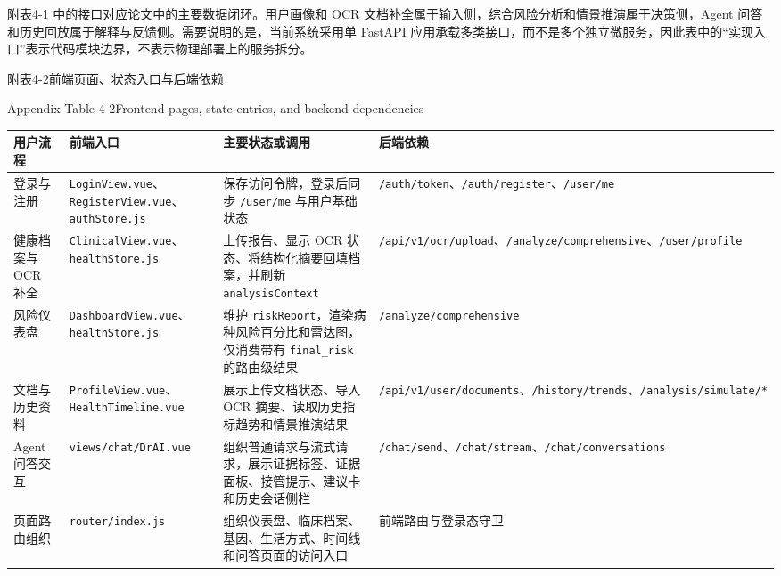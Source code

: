 \documentclass[UTF8, a4paper, 12pt, oneside]{ctexrep}
\numberwithin{equation}{chapter}
\newcommand{\codeid}[1]{{\begingroup\urlstyle{rm}\nolinkurl{#1}\endgroup}}
\begin{document}
{\vspace{\baselineskip}
附表4-1 中的接口对应论文中的主要数据闭环。用户画像和 OCR 文档补全属于输入侧，综合风险分析和情景推演属于决策侧，Agent 问答和历史回放属于解释与反馈侧。需要说明的是，当前系统采用单 FastAPI 应用承载多类接口，而不是多个独立微服务，因此表中的“实现入口”表示代码模块边界，不表示物理部署上的服务拆分。

\vspace{0.5\baselineskip}
\begin{center}
{\songti{}附表4-2\quad 前端页面、状态入口与后端依赖\par}
{\rmfamily{}Appendix Table 4-2\quad Frontend pages, state entries, and backend dependencies\par}
\end{center}
\vspace{-0.5\baselineskip}
{\songti{}
\noindent\begin{tabular}{@{}>{\raggedright\arraybackslash}p{} >{\raggedright\arraybackslash}p{} >{\raggedright\arraybackslash}p{} >{\raggedright\arraybackslash}p{}@{}}
\toprule
用户流程 & 前端入口 & 主要状态或调用 & 后端依赖 \\
\midrule
登录与注册 & \codeid{LoginView.vue}、\codeid{RegisterView.vue}、\codeid{authStore.js} & 保存访问令牌，登录后同步 \codeid{/user/me} 与用户基础状态 & \codeid{/auth/token}、\codeid{/auth/register}、\codeid{/user/me} \\
健康档案与 OCR 补全 & \codeid{ClinicalView.vue}、\codeid{healthStore.js} & 上传报告、显示 OCR 状态、将结构化摘要回填档案，并刷新 \codeid{analysisContext} & \codeid{/api/v1/ocr/upload}、\codeid{/analyze/comprehensive}、\codeid{/user/profile} \\
风险仪表盘 & \codeid{DashboardView.vue}、\codeid{healthStore.js} & 维护 \codeid{riskReport}，渲染病种风险百分比和雷达图，仅消费带有 \codeid{final_risk} 的路由级结果 & \codeid{/analyze/comprehensive} \\
文档与历史资料 & \codeid{ProfileView.vue}、\codeid{HealthTimeline.vue} & 展示上传文档状态、导入 OCR 摘要、读取历史指标趋势和情景推演结果 & \codeid{/api/v1/user/documents}、\codeid{/history/trends}、\codeid{/analysis/simulate/*} \\
Agent 问答交互 & \codeid{views/chat/DrAI.vue} & 组织普通请求与流式请求，展示证据标签、证据面板、接管提示、建议卡和历史会话侧栏 & \codeid{/chat/send}、\codeid{/chat/stream}、\codeid{/chat/conversations} \\
页面路由组织 & \codeid{router/index.js} & 组织仪表盘、临床档案、基因、生活方式、时间线和问答页面的访问入口 & 前端路由与登录态守卫 \\
\bottomrule
\end{tabular}
}

}
\end{document}
